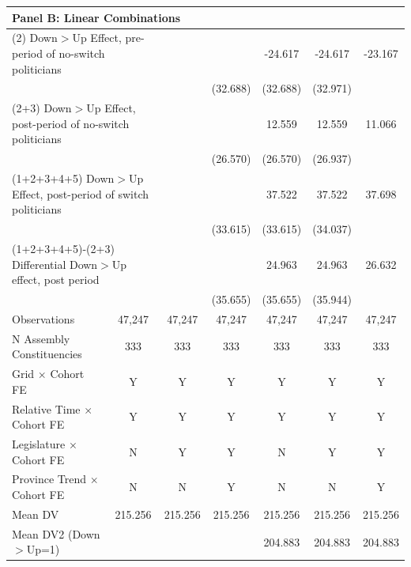 {\begin{tabular}{l*{6}{c}}
\hline
\multicolumn{7}{l}{\textbf{Panel B: Linear Combinations}} \\ \hline
\multicolumn{2}{l}{(2) Down$>$Up Effect, pre-period of no-switch politicians}&            &            &     -24.617&     -24.617&     -23.167\\
            &            &            &    (32.688)&    (32.688)&    (32.971)\\
\multicolumn{2}{l}{(2+3) Down$>$Up Effect, post-period of no-switch politicians}&            &            &      12.559&      12.559&      11.066\\
            &            &            &    (26.570)&    (26.570)&    (26.937)\\
\multicolumn{2}{l}{(1+2+3+4+5) Down$>$Up Effect, post-period of switch politicians}&            &            &      37.522&      37.522&      37.698\\
            &            &            &    (33.615)&    (33.615)&    (34.037)\\
\multicolumn{2}{l}{(1+2+3+4+5)-(2+3) Differential Down$>$Up effect, post period}&            &            &      24.963&      24.963&      26.632\\
            &            &            &    (35.655)&    (35.655)&    (35.944)\\



\hline
Observations&      47,247&      47,247&      47,247&      47,247&      47,247&      47,247\\
N Assembly Constituencies&         333&         333&         333&         333&         333&         333\\
Grid $\times$ Cohort FE&           Y&           Y&           Y&           Y&           Y&           Y\\
Relative Time $\times$ Cohort FE&           Y&           Y&           Y&           Y&           Y&           Y\\
Legislature $\times$ Cohort FE&           N&           Y&           Y&           N&           Y&           Y\\
Province Trend $\times$ Cohort FE&           N&           N&           Y&           N&           N&           Y\\
Mean DV     &     215.256&     215.256&     215.256&     215.256&     215.256&     215.256\\
Mean DV2 (Down$>$Up=1)&            &            &            &     204.883&     204.883&     204.883\\
\hline
\end{tabular}
}
